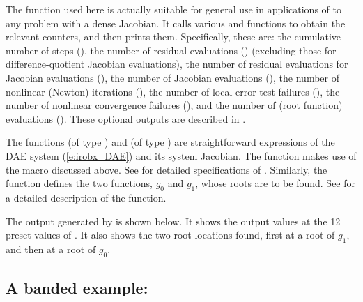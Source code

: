 The function  used here is actually suitable for
general use in applications of {\ida} to any problem with a dense
Jacobian.  It calls various  and 
functions to obtain the relevant counters, and then prints them.
Specifically, these are: the cumulative number of steps (), 
the number of residual evaluations () (excluding those for
difference-quotient Jacobian evaluations),
the number of residual evaluations for Jacobian evaluations (),
the number of Jacobian evaluations (),
the number of nonlinear (Newton) iterations (),
the number of local error test failures (),
the number of nonlinear convergence failures (),
and the number of  (root function) evaluations ().
These optional outputs are described in .

The functions  (of type ) and  (of type
) are straightforward expressions of the DAE system
(\ref{e:irobx_DAE}) and its system Jacobian.  The function 
makes use of the macro  discussed above.  See 
for detailed specifications of .  Similarly, the function
 defines the two functions, $g_0$ and $g_1$, whose roots are
to be found.  See  for a detailed description of the
 function.

The output generated by  is shown below.  It shows the output
values at the 12 preset values of .  It also shows the two root
locations found, first at a root of $g_1$, and then at a root of $g_0$.

\subsection{A banded example: }\label{ss:iwebsb}

